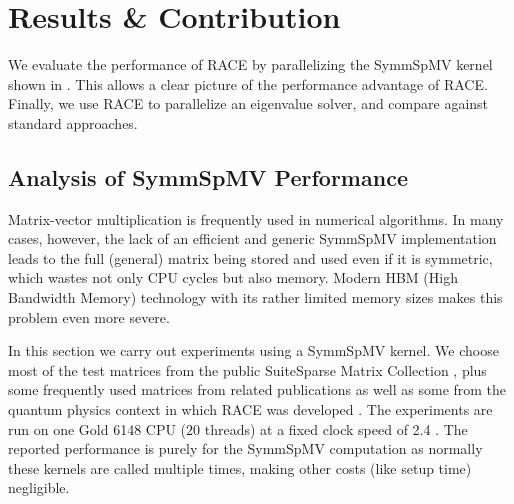  
\section{Results \& Contribution} \label{sec:results}
We evaluate the performance of \acrshort{RACE} by parallelizing the \acrshort{SymmSpMV}
kernel shown in . This allows a clear picture of the
performance advantage of \acrshort{RACE}. Finally,
 we use \acrshort{RACE} to parallelize an eigenvalue solver, 
and compare against standard approaches.

\subsection{Analysis of SymmSpMV Performance} \label{subsec:perf_symm_spmv}
Matrix-vector multiplication is frequently used in
numerical algorithms. In many cases, however, 
the lack of an efficient and generic \acrshort{SymmSpMV} implementation
leads to the full (general) matrix being stored and used even if it is
symmetric, which wastes not only CPU cycles but also memory.
Modern HBM (High Bandwidth Memory) technology with its rather limited
memory sizes makes this problem even more severe. 

In this section we carry out experiments using a \acrshort{SymmSpMV} kernel.
We choose most of the test matrices from the public SuiteSparse Matrix Collection \cite{UOF}, plus some frequently 
used matrices from related publications \cite{RSB,park_ls} as well as
some from the quantum physics context 
in which \acrshort{RACE} was developed \cite{ESSEX}.
The experiments are
run on one \Intel \SKX Gold 6148 CPU ($20$ threads) at a fixed clock speed of
2.4 \GHZ. The reported performance is purely for the \acrshort{SymmSpMV}
computation as normally these kernels are called multiple times, making other
costs (like setup time) negligible.

